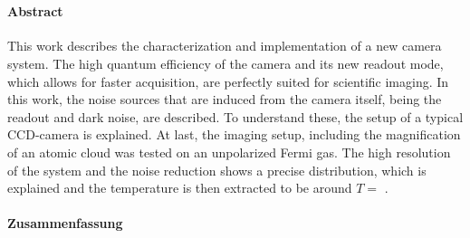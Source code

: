 \cleardoublepage
\thispagestyle{plain}

\makeatletter
\begin{center}
	\large\textbf{\@title}\\
	\normalsize\@author
\end{center}
\makeatother

\paragraph{Abstract}

This work describes the characterization and implementation of a new camera system. The high quantum efficiency of the camera and its new readout mode, which allows for faster acquisition, are perfectly suited for scientific imaging. In this work, the noise sources that are induced from the camera itself, being the readout and dark noise, are described. To understand these, the setup of a typical CCD-camera is explained. At last, the imaging setup, including the magnification of an atomic cloud was tested on an unpolarized Fermi gas. The high resolution of the system and the noise reduction shows a precise distribution, which is explained and the temperature is then extracted to be around $T=$ .

\begin{otherlanguage}{ngerman}

\paragraph{Zusammenfassung}

\lipsum[1-1]

\end{otherlanguage}
